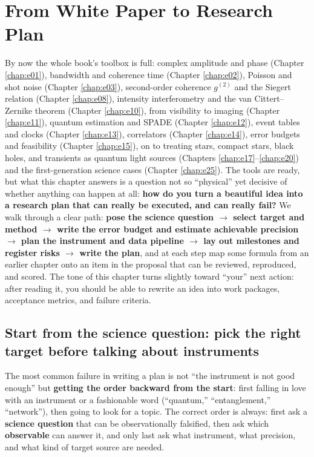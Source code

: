 \chapter{From White Paper to Research Plan}
\label{chap:e28}

\begin{chapteropening}
By now the whole book's toolbox is full: complex amplitude and phase (Chapter \ref{chap:e01}), bandwidth and coherence time (Chapter \ref{chap:e02}), Poisson and shot noise (Chapter \ref{chap:e03}), second-order coherence \(g^{(2)}\) and the Siegert relation (Chapter \ref{chap:e08}), intensity interferometry and the van Cittert--Zernike theorem (Chapter \ref{chap:e10}), from visibility to imaging (Chapter \ref{chap:e11}), quantum estimation and SPADE (Chapter \ref{chap:e12}), event tables and clocks (Chapter \ref{chap:e13}), correlators (Chapter \ref{chap:e14}), error budgets and feasibility (Chapter \ref{chap:e15}), on to treating stars, compact stars, black holes, and transients as quantum light sources (Chapters \ref{chap:e17}--\ref{chap:e20}) and the first-generation science cases (Chapter \ref{chap:e25}). The tools are ready, but what this chapter answers is a question not so ``physical'' yet decisive of whether anything can happen at all: \textbf{how do you turn a beautiful idea into a research plan that can really be executed, and can really fail?} We walk through a clear path: \textbf{pose the science question \(\to\) select target and method \(\to\) write the error budget and estimate achievable precision \(\to\) plan the instrument and data pipeline \(\to\) lay out milestones and register risks \(\to\) write the plan}, and at each step map some formula from an earlier chapter onto an item in the proposal that can be reviewed, reproduced, and scored. The tone of this chapter turns slightly toward ``your'' next action: after reading it, you should be able to rewrite an idea into work packages, acceptance metrics, and failure criteria.
\end{chapteropening}

\section{Start from the science question: pick the right target before talking about instruments}
\label{sec:e28-question}

The most common failure in writing a plan is not ``the instrument is not good enough'' but \textbf{getting the order backward from the start}: first falling in love with an instrument or a fashionable word (``quantum,'' ``entanglement,'' ``network''), then going to look for a topic. The correct order is always: first ask a \textbf{science question} that can be observationally falsified, then ask which \textbf{observable} can answer it, and only last ask what instrument, what precision, and what kind of target source are needed.

